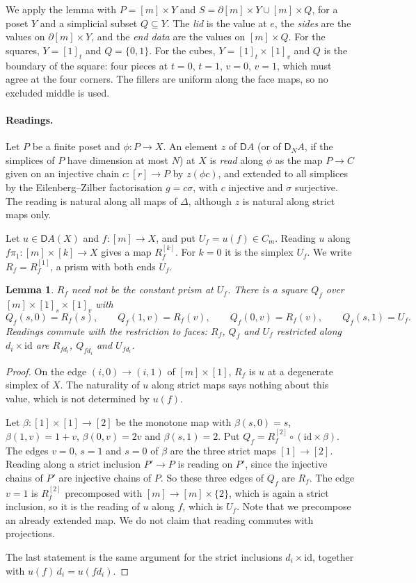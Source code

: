 \documentclass[11pt]{article}
\newcommand{\id}{\mathrm{id}}
\newcommand{\D}{\mathsf{D}}
\theoremstyle{plain}
\newtheorem{lemma}[theorem]{Lemma}
\theoremstyle{definition}
\theoremstyle{remark}
\begin{document}
We apply the lemma with $P=[m]\times Y$ and
$S=\partial[m]\times Y\cup[m]\times Q$, for a poset $Y$ and a simplicial
subset $Q\subseteq Y$. The \emph{lid} is the value at $e$, the \emph{sides}
are the values on $\partial[m]\times Y$, and the \emph{end data} are the
values on $[m]\times Q$. For the squares, $Y=[1]_t$ and $Q=\{0,1\}$. For the
cubes, $Y=[1]_t\times[1]_v$ and $Q$ is the boundary of the square: four
pieces at $t=0$, $t=1$, $v=0$, $v=1$, which must agree at the four corners.
The fillers are uniform along the face maps, so no excluded middle is used.

\paragraph{Readings.} Let $P$ be a finite poset and $\phi:P\to X$. An
element $z$ of $\D A$ (or of $\D_NA$, if the simplices of $P$ have
dimension at most $N$) at $X$ is \emph{read} along $\phi$ as the map
$P\to C$ given on an injective chain $c:[r]\to P$ by $z(\phi c)$, and
extended to all simplices by the Eilenberg--Zilber factorisation $g=c\sigma$,
with $c$ injective and $\sigma$ surjective. The reading is natural along
all maps of $\Delta$, although $z$ is natural along strict maps only.

Let $u\in\D A(X)$ and $f:[m]\to X$, and put $U_f=u(f)\in C_m$. Reading $u$
along $f\pi_1:[m]\times[k]\to X$ gives a map $R_f^{[k]}$. For $k=0$ it is
the simplex $U_f$. We write $R_f=R_f^{[1]}$, a prism with both ends $U_f$.

\begin{lemma}\label{lem:R}
$R_f$ need not be the constant prism at $U_f$. There is a square $Q_f$ over
$[m]\times[1]_s\times[1]_v$ with
\[
Q_f(s,0)=R_f(s),\qquad Q_f(1,v)=R_f(v),\qquad Q_f(0,v)=R_f(v),\qquad
Q_f(s,1)=U_f .
\]
Readings commute with the restriction to faces: $R_f$, $Q_f$ and $U_f$
restricted along $d_i\times\id$ are $R_{fd_i}$, $Q_{fd_i}$ and $U_{fd_i}$.
\end{lemma}

\begin{proof}
On the edge $(i,0)\to(i,1)$ of $[m]\times[1]$, $R_f$ is $u$ at a degenerate
simplex of $X$. The naturality of $u$ along strict maps says nothing about
this value, which is not determined by $u(f)$.

Let $\beta:[1]\times[1]\to[2]$ be the monotone map with $\beta(s,0)=s$,
$\beta(1,v)=1+v$, $\beta(0,v)=2v$ and $\beta(s,1)=2$. Put
$Q_f=R_f^{[2]}\circ(\id\times\beta)$. The edges $v=0$, $s=1$ and $s=0$ of
$\beta$ are the three strict maps $[1]\to[2]$. Reading along a strict
inclusion $P'\to P$ is reading on $P'$, since the injective chains of $P'$
are injective chains of $P$. So these three edges of $Q_f$ are $R_f$. The
edge $v=1$ is $R_f^{[2]}$ precomposed with $[m]\to[m]\times\{2\}$, which is
again a strict inclusion, so it is the reading of $u$ along $f$, which is
$U_f$. Note that we precompose an already extended map. We do not claim
that reading commutes with projections.

The last statement is the same argument for the strict inclusions
$d_i\times\id$, together with $u(f)\,d_i=u(fd_i)$.
\end{proof}
\end{document}
